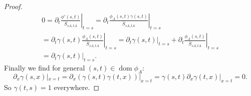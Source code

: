 \documentclass[b5paper,draft,openbib,12pt]{memoir}
\DeclareMathOperator{\dom}{dom}
\begin{document}
\begin{proof}
\begin{align}
0=\partial_t \left.\frac{\phi'(s,t)}{\overline{S}_{sA,tA}}\right|_{t=s}
=\partial_t \left.\frac{\phi_A(s,t) \gamma(s,t)}{\overline{S}_{sA,tA}}\right|_{t=s}\\
=\partial_t \left.\gamma(s,t) \frac{\phi_A(s,t)}{\overline{S}_{sA,tA}}\right|_{t=s}
=\partial_t \left.\gamma(s,t)\right|_{t=s} + \partial_t  \left.\frac{\phi_A(s,t)}{\overline{S}_{sA,tA}}\right|_{t=s}\\
=\partial_t \left.\gamma(s,t)\right|_{t=s}.
\end{align}
Finally we find for general \((s,t)\in \dom\phi_A\):
\begin{equation}
\partial_x \gamma(s,x)|_{x=t}=\partial_x ( \gamma(s,t) \gamma(t,x))|_{x=t}=\gamma(s,t) \partial_x \gamma(t,x)|_{x=t}=0.
\end{equation}
So \(\gamma(t,s)=1\) everywhere.

\end{proof}
\end{document}
